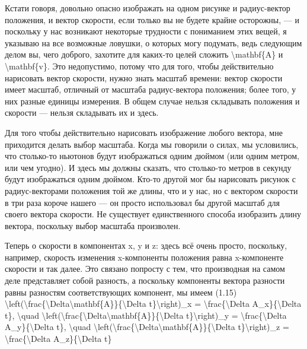 \documentclass[10pt,oneside]{article}
\begin{document}
Кстати говоря, довольно опасно изображать на одном рисунке и радиус-вектор положения, и вектор скорости, если только вы не будете крайне осторожны, --- и поскольку у нас возникают некоторые трудности с пониманием этих вещей, я указываю на все возможные ловушки, о которых могу подумать, ведь следующим делом вы, чего доброго, захотите для каких-то целей сложить \textbackslash{}mathbf\{A\} и \textbackslash{}mathbf\{v\}. Это недопустимо, потому что для того, чтобы действительно нарисовать вектор скорости, нужно знать масштаб времени: вектор скорости имеет масштаб, отличный от масштаба радиус-вектора положения; более того, у них разные единицы измерения. В общем случае нельзя складывать положения и скорости --- нельзя складывать их и здесь.\par

Для того чтобы действительно нарисовать изображение любого вектора, мне приходится делать выбор масштаба. Когда мы говорили о силах, мы условились, что столько-то ньютонов будут изображаться одним дюймом (или одним метром, или чем угодно). И здесь мы должны сказать, что столько-то метров в секунду будут изображаться одним дюймом. Кто-то другой мог бы нарисовать рисунок с радиус-векторами положения той же длины, что и у нас, но с вектором скорости в три раза короче нашего --- он просто использовал бы другой масштаб для своего вектора скорости. Не существует единственного способа изобразить длину вектора, поскольку выбор масштаба произволен.\par

Теперь о скорости в компонентах x, y и z: здесь всё очень просто, поскольку, например, скорость изменения x-компоненты положения равна x-компоненте скорости и так далее. Это связано попросту с тем, что производная на самом деле представляет собой разность, а поскольку компоненты вектора разности равны разностям соответствующих компонент, мы имеем (1.15) \textbackslash{}left(\textbackslash{}frac\{\textbackslash{}Delta\textbackslash{}mathbf\{A\}\}\{\textbackslash{}Delta t\}\textbackslash{}right)\_x = \textbackslash{}frac\{\textbackslash{}Delta A\_x\}\{\textbackslash{}Delta t\}, \textbackslash{}quad \textbackslash{}left(\textbackslash{}frac\{\textbackslash{}Delta\textbackslash{}mathbf\{A\}\}\{\textbackslash{}Delta t\}\textbackslash{}right)\_y = \textbackslash{}frac\{\textbackslash{}Delta A\_y\}\{\textbackslash{}Delta t\}, \textbackslash{}quad \textbackslash{}left(\textbackslash{}frac\{\textbackslash{}Delta\textbackslash{}mathbf\{A\}\}\{\textbackslash{}Delta t\}\textbackslash{}right)\_z = \textbackslash{}frac\{\textbackslash{}Delta A\_z\}\{\textbackslash{}Delta t\}\par
\end{document}
